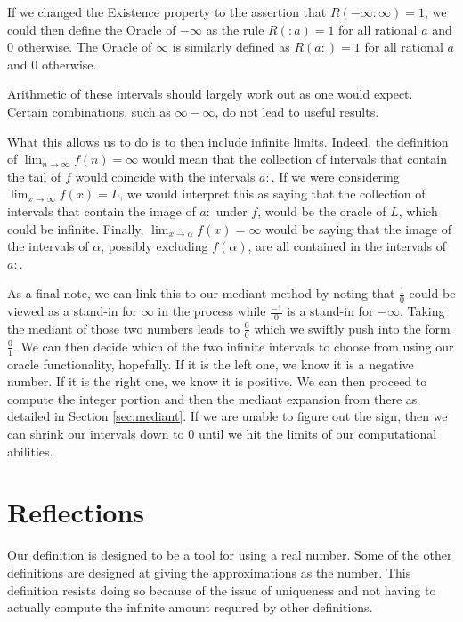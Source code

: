\documentclass[12pt]{article}
\theoremstyle{remark}
\begin{document}
If we changed the Existence property to the assertion that $R(-\infty:\infty)=1$, we could then define the Oracle of $-\infty$ as the rule $R(:a) = 1$ for all rational $a$ and 0 otherwise. The Oracle of $\infty$ is similarly defined as $R(a:)=1$  for all rational $a$ and 0 otherwise. 

Arithmetic of these intervals should largely work out as one would expect. Certain combinations, such as $\infty-\infty$, do not lead to useful results. 

What this allows us to do is to then include infinite limits. Indeed, the definition of $\lim_{n\to \infty} f(n) = \infty$ would mean that the collection of intervals that contain the tail of $f$ would coincide with the intervals $a:$. If we were considering $\lim_{x \to \infty} f(x) = L$, we would interpret this as saying that the collection of intervals that contain the image of $a:$ under $f$, would be the oracle of $L$, which could be infinite.  Finally, $\lim_{x \to \alpha} f(x) = \infty$ would be saying that the image of the intervals of $\alpha$, possibly excluding $f(\alpha)$, are all contained in the intervals of $a:$. 

As a final note, we can link this to our mediant method by noting that $\frac{1}{0}$ could be viewed as a stand-in for $\infty$ in the process while $\frac{-1}{0}$ is a stand-in for $-\infty$. Taking the mediant of those two numbers leads to $\frac{0}{0}$ which we swiftly push into the form $\frac{0}{1}$. We can then decide which of the two infinite intervals to choose from using our oracle functionality, hopefully. If it is the left one, we know it is a negative number. If it is the right one, we know it is positive. We can then proceed to compute the integer portion and then the mediant expansion from there as detailed in Section \ref{sec:mediant}. If we are unable to figure out the sign, then we can shrink our intervals down to $0$ until we hit the limits of our computational abilities. 

\section{Reflections}



Our definition is designed to be a tool for using a real number. Some of the other definitions are designed at giving the approximations as the number. This definition resists doing so because of the issue of uniqueness and not having to actually compute the infinite amount required by other definitions. 
\end{document}
